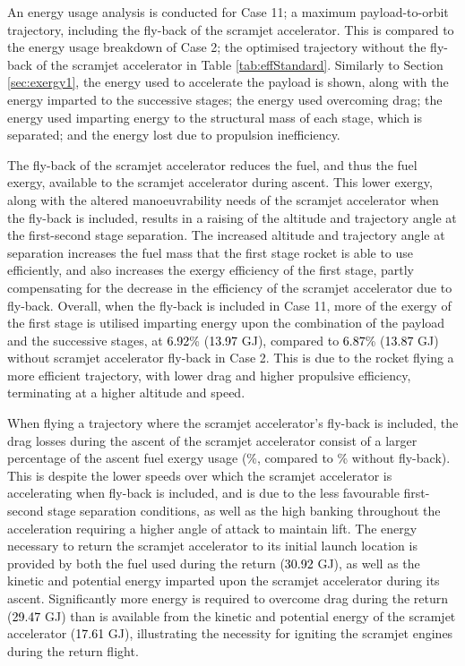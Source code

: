 An energy usage analysis is conducted for Case 11; a maximum payload-to-orbit trajectory, including the fly-back of the scramjet accelerator. This is compared to the energy usage breakdown of Case 2; the optimised trajectory without the fly-back of the scramjet accelerator in Table \ref{tab:effStandard}. Similarly to Section \ref{sec:exergy1}, the energy used to accelerate the payload is shown, along with the energy imparted to the successive stages; the energy used overcoming drag; the energy used imparting energy to the structural mass of each stage, which is separated; and the energy lost due to propulsion inefficiency. 



The fly-back of the scramjet accelerator reduces the fuel, and thus the fuel exergy, available to the scramjet accelerator during ascent.
This lower exergy, along with the altered manoeuvrability needs of the scramjet accelerator when the fly-back is included, results in a raising of the altitude and trajectory angle at the first-second stage separation. The increased altitude and trajectory angle at separation increases the fuel mass that the first stage rocket is able to use efficiently, and also increases the exergy efficiency of the first stage, partly compensating for the decrease in the efficiency of the scramjet accelerator due to fly-back. Overall, when the fly-back is included in Case 11, more of the exergy of the first stage is utilised imparting energy upon the combination of the payload and the successive stages, at \textcolor{black}{6.92}\% (\textcolor{black}{13.97} GJ), compared to \textcolor{black}{6.87}\% (\textcolor{black}{13.87} GJ) without scramjet accelerator fly-back in Case 2. This is due to the rocket flying a more efficient trajectory, with lower drag and higher propulsive efficiency, terminating at a higher altitude and speed.



When flying a trajectory where the scramjet accelerator's fly-back is included, the drag losses during the ascent of the scramjet accelerator consist of a larger percentage of the ascent fuel exergy usage  (\WDsecondStandard \%, compared to \WDsecondStandardNoReturn \% without fly-back). This is despite the lower speeds over which the scramjet accelerator is accelerating when fly-back is included, and is due to the less favourable first-second stage separation conditions, as well as the high banking throughout the acceleration requiring a higher angle of attack to maintain lift. 
The energy necessary to return the scramjet accelerator to its initial launch location is provided by both the fuel used during the return (\textcolor{black}{30.92} GJ), as well as the kinetic and potential energy imparted upon the scramjet accelerator during its ascent. Significantly more energy is required to overcome drag during the return (\textcolor{black}{29.47} GJ) than is available from the kinetic and potential energy of the scramjet accelerator (\textcolor{black}{17.61} GJ), illustrating the necessity for igniting the scramjet engines during the return flight. 


